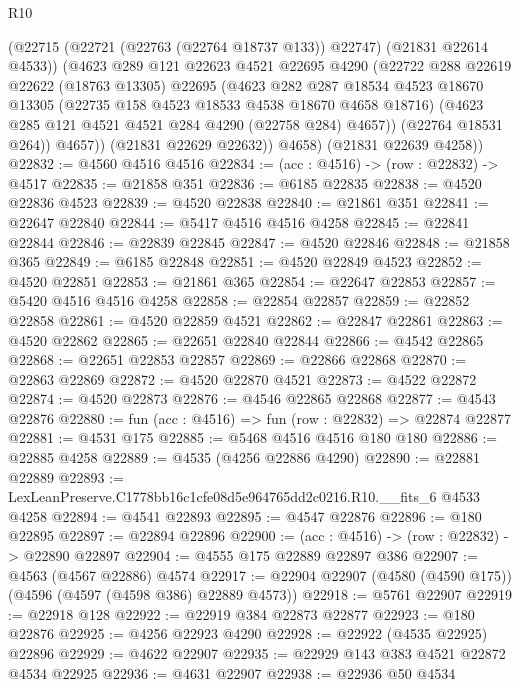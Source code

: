 \begin{lexlean}{R10}
\begin{coremodule}
            (@22715 (@22721 (@22763 (@22764 @18737 @133)) @22747) (@21831 @22614 @4533))
            (@4623
              @289
              @121
              @22623
              @4521
              @22695
              @4290
              (@22722
                @288
                @22619
                @22622
                (@18763 @13305)
                @22695
                (@4623
                  @282
                  @287
                  @18534
                  @4523
                  @18670
                  @13305
                  (@22735 @158 @4523 @18533 @4538 @18670 @4658 @18716)
                  (@4623 @285 @121 @4521 @4521 @284 @4290 (@22758 @284) @4657))
                (@22764 @18531 @264))
              @4657))
          (@21831 @22629 @22632))
        @4658)
      (@21831 @22639 @4258))
@22832 := @4560 @4516 @4516
@22834 := (acc : @4516) -> (row : @22832) -> @4517
@22835 := @21858 @351
@22836 := @6185 @22835
@22838 := @4520 @22836 @4523
@22839 := @4520 @22838
@22840 := @21861 @351
@22841 := @22647 @22840
@22844 := @5417 @4516 @4516 @4258
@22845 := @22841 @22844
@22846 := @22839 @22845
@22847 := @4520 @22846
@22848 := @21858 @365
@22849 := @6185 @22848
@22851 := @4520 @22849 @4523
@22852 := @4520 @22851
@22853 := @21861 @365
@22854 := @22647 @22853
@22857 := @5420 @4516 @4516 @4258
@22858 := @22854 @22857
@22859 := @22852 @22858
@22861 := @4520 @22859 @4521
@22862 := @22847 @22861
@22863 := @4520 @22862
@22865 := @22651 @22840 @22844
@22866 := @4542 @22865
@22868 := @22651 @22853 @22857
@22869 := @22866 @22868
@22870 := @22863 @22869
@22872 := @4520 @22870 @4521
@22873 := @4522 @22872
@22874 := @4520 @22873
@22876 := @4546 @22865 @22868
@22877 := @4543 @22876
@22880 := fun (acc : @4516) => fun (row : @22832) => @22874 @22877
@22881 := @4531 @175
@22885 := @5468 @4516 @4516 @180 @180
@22886 := @22885 @4258
@22889 := @4535 (@4256 @22886 @4290)
@22890 := @22881 @22889
@22893 := LexLeanPreserve.C1778bb16c1cfe08d5e964765dd2c0216.R10.__fits_6 @4533 @4258
@22894 := @4541 @22893
@22895 := @4547 @22876
@22896 := @180 @22895
@22897 := @22894 @22896
@22900 := (acc : @4516) -> (row : @22832) -> @22890 @22897
@22904 := @4555 @175 @22889 @22897 @386
@22907 := @4563 (@4567 @22886) @4574
@22917 := @22904 @22907 (@4580 (@4590 @175)) (@4596 (@4597 (@4598 @386) @22889 @4573))
@22918 := @5761 @22907
@22919 := @22918 @128
@22922 := @22919 @384 @22873 @22877
@22923 := @180 @22876
@22925 := @4256 @22923 @4290
@22928 := @22922 (@4535 @22925) @22896
@22929 := @4622 @22907
@22935 := @22929 @143 @383 @4521 @22872 @4534 @22925
@22936 := @4631 @22907
@22938 := @22936 @50 @4534

\end{coremodule}
\end{lexlean}

